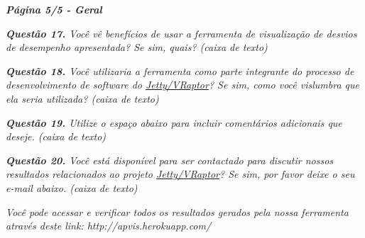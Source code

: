 \begin{framed}
	\noindent \textit{\textbf{Página 5/5 - Geral}}
	\par
	\noindent \textit{\textbf{Questão 17.} Você vê benefícios de usar a ferramenta de visualização de desvios de desempenho apresentada? Se sim, quais? (caixa de texto)}
	\par
	\noindent \textit{\textbf{Questão 18.} Você utilizaria a ferramenta como parte integrante do processo de desenvolvimento de software do \underline{Jetty/VRaptor}? Se sim, como você vislumbra que ela seria utilizada? (caixa de texto)}
	\par
	\noindent \textit{\textbf{Questão 19.} Utilize o espaço abaixo para incluir comentários adicionais que deseje. (caixa de texto)}
	\par
	\noindent \textit{\textbf{Questão 20.} Você está disponível para ser contactado para discutir nossos resultados relacionados ao projeto \underline{Jetty/VRaptor}? Se sim, por favor deixe o seu e-mail abaixo. (caixa de texto)}

	\noindent \textit{Você pode acessar e verificar todos os resultados gerados pela nossa ferramenta através deste link: http://apvis.herokuapp.com/}
\end{framed}